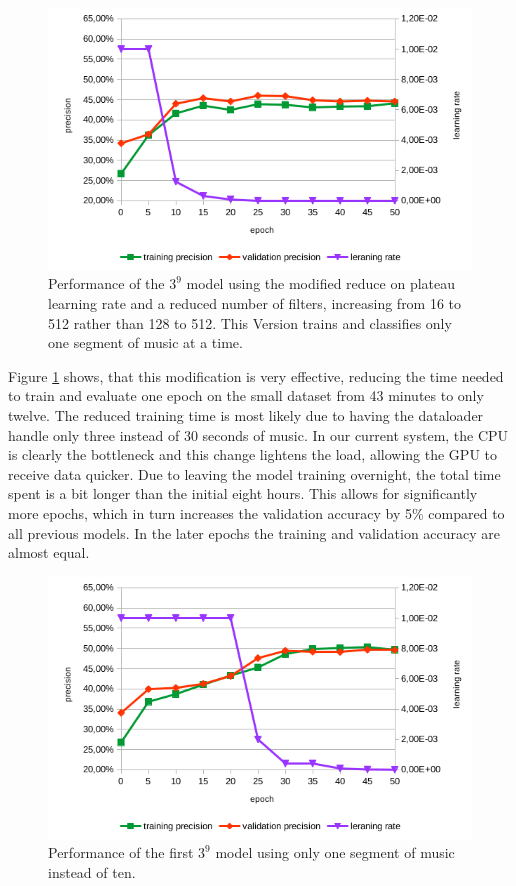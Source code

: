 \begin{figure}[!htb]
	\centering
	\includegraphics[width=.9\linewidth]{images/sample-dcnn-m3-n9-seg1-16_512-plateau_mod.png}
	\caption{Performance of the $3^9$ model using the modified reduce on plateau learning rate and a reduced number of filters, increasing from 16 to 512 rather than 128 to 512. This Version trains and classifies only one segment of music at a time.}
	\label{fig:sample-dcnn-m3-n9-seg1-16_512-plateau_mod}
\end{figure}

Figure \ref{fig:sample-dcnn-m3-n9-seg1-16_512-plateau_mod} shows, that this modification is very effective, reducing the time needed to train and evaluate one epoch on the small dataset from 43 minutes to only twelve. The reduced training time is most likely due to having the dataloader handle only three instead of 30 seconds of music. In our current system, the CPU is clearly the bottleneck and this change lightens the load, allowing the GPU to receive data quicker. Due to leaving the model training overnight, the total time spent is a bit longer than the initial eight hours. This allows for significantly more epochs, which in turn increases the validation accuracy by 5\% compared to all previous models. In the later epochs the training and validation accuracy are almost equal.

\begin{figure}[!htb]
	\centering
	\includegraphics[width=.9\linewidth]{images/sample-dcnn-m3-n9-seg1-128_512-plateau.png}
	\caption{Performance of the first $3^9$ model using only one segment of music instead of ten.}
	\label{fig:sample-dcnn-m3-n9-seg1-128_512-plateau}
\end{figure}

